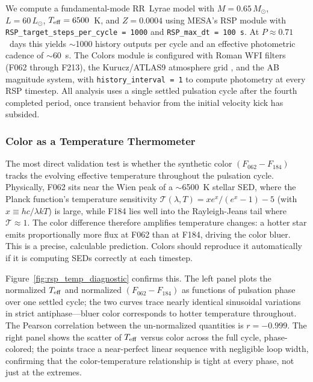 \documentclass[linenumbers,apj,twocolumn, floatfix]{aastex701}
\begin{document}
We compute a fundamental-mode RR~Lyrae model with $M = 0.65\,M_\odot$, $L = 60\,L_\odot$, $T_{\rm eff} = 6500$~K, and $Z = 0.0004$ using MESA's RSP module \citep{MESAV} with \texttt{RSP\_target\_steps\_per\_cycle = 1000} and \texttt{RSP\_max\_dt = 100\,s}.
At $P \approx 0.71$~days this yields $\sim$1000 history outputs per cycle and an effective photometric cadence of $\sim$60~s.
The Colors module is configured with Roman WFI filters (F062 through F213), the Kurucz/ATLAS9 atmosphere grid \citep{Castelli04}, and the AB magnitude system, with \texttt{history\_interval = 1} to compute photometry at every RSP timestep.
All analysis uses a single settled pulsation cycle after the fourth completed period, once transient behavior from the initial velocity kick has subsided.

\subsubsection{Color as a Temperature Thermometer}
\label{sec:rsp_temp}

The most direct validation test is whether the synthetic color $(F_{062} - F_{184})$ tracks the evolving effective temperature throughout the pulsation cycle.
Physically, F062 sits near the Wien peak of a $\sim$6500~K stellar SED, where the Planck function's temperature sensitivity $\mathcal{T}(\lambda,T) = xe^x/(e^x-1) - 5$ (with $x \equiv hc/\lambda kT$) is large, while F184 lies well into the Rayleigh-Jeans tail where $\mathcal{T} \approx 1$.
The color difference therefore amplifies temperature changes: a hotter star emits proportionally more flux at F062 than at F184, driving the color bluer.
This is a precise, calculable prediction.
Colors should reproduce it automatically if it is computing SEDs correctly at each timestep.

Figure~\ref{fig:rsp_temp_diagnostic} confirms this.
The left panel plots the normalized $T_{\rm eff}$ and normalized $(F_{062} - F_{184})$ as functions of pulsation phase over one settled cycle; the two curves trace nearly identical sinusoidal variations in strict antiphase—bluer color corresponds to hotter temperature throughout.
The Pearson correlation between the un-normalized quantities is $r = -0.999$.
The right panel shows the scatter of $T_{\rm eff}$ versus color across the full cycle, phase-colored; the points trace a near-perfect linear sequence with negligible loop width, confirming that the color-temperature relationship is tight at every phase, not just at the extremes.
\end{document}

